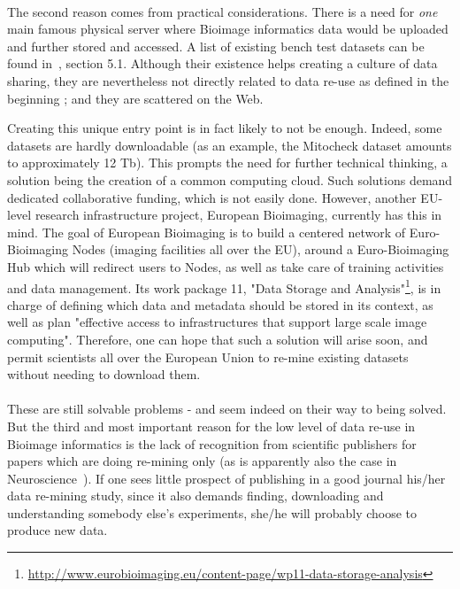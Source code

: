 \documentclass[12pt]{article}
\begin{document}
\paragraph*{}
The second reason comes from practical considerations. There is a need for \textit{one} main famous physical server where Bioimage informatics data would be uploaded and further stored and accessed. A list of existing bench test datasets can be found in~\cite{pmid18603566}, section 5.1. Although their existence helps creating a culture of data sharing, they are nevertheless not directly related to data re-use as defined in the beginning ; and they are scattered on the Web. 

Creating this unique entry point is in fact likely to not be enough. Indeed, some datasets are hardly downloadable (as an example, the Mitocheck dataset amounts to approximately 12 Tb). This prompts the need for further technical thinking, a solution being the creation of a common computing cloud. Such solutions demand dedicated collaborative funding, which is not easily done. However, another EU-level research infrastructure project, European Bioimaging, currently has this in mind. The goal of European Bioimaging is to build a centered network of Euro-Bioimaging Nodes (imaging facilities all over the EU), around a Euro-Bioimaging Hub which will redirect users to Nodes, as well as take care of training activities and data management. Its work package 11, "Data Storage and Analysis"\footnote{\href{http://www.eurobioimaging.eu/content-page/wp11-data-storage-analysis}{http://www.eurobioimaging.eu/content-page/wp11-data-storage-analysis}}, is in charge of defining which data and metadata should be stored in its context, as well as plan "effective access to infrastructures that support large scale image computing". Therefore, one can hope that such a solution will arise soon, and permit scientists all over the European Union to re-mine existing datasets without needing to download them.

\paragraph*{}
These are still solvable problems - and seem indeed on their way to being solved. But the third and most important reason for the low level of data re-use in Bioimage informatics is the lack of recognition from scientific publishers for papers which are doing re-mining only (as is apparently also the case in Neuroscience~\cite{pmid24904347}). If one sees little prospect of publishing in a good journal his/her data re-mining study, since it also demands finding, downloading and understanding somebody else's experiments, she/he will probably choose to produce new data.
\end{document}
